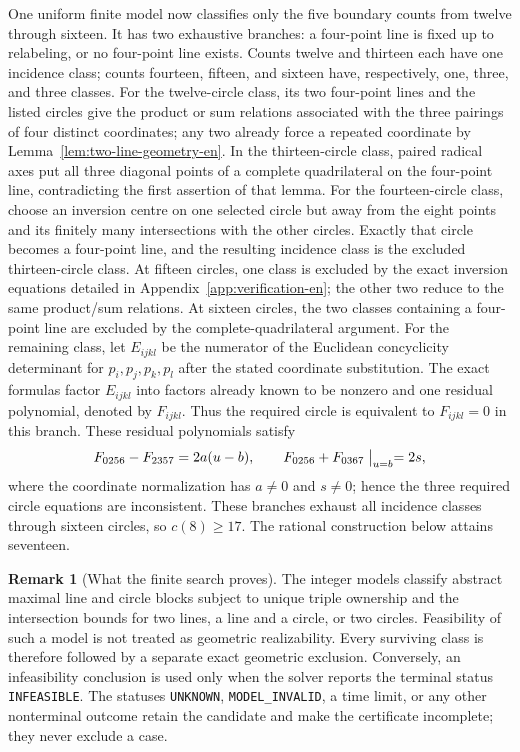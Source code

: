 \documentclass[11pt,a4paper]{article}
\theoremstyle{definition}
\newtheorem{remark}[theorem]{Remark}
\begin{document}
One uniform finite model now classifies only the five boundary counts from
twelve through sixteen.  It has two exhaustive branches: a four-point line is
fixed up to relabeling, or no four-point line exists.  Counts twelve and thirteen
each have one incidence class; counts fourteen, fifteen, and sixteen have,
respectively, one, three, and three classes.  For the
twelve-circle class, its two
four-point lines and the listed circles give the product or sum relations associated
with the three pairings of four distinct coordinates; any two already force a
repeated coordinate by Lemma~\ref{lem:two-line-geometry-en}.  In the
thirteen-circle class, paired radical axes put all three diagonal points of a
complete quadrilateral on the four-point line, contradicting the first assertion of
that lemma.  For the fourteen-circle class, choose an inversion centre on one
selected circle but away from the eight points and its finitely many intersections
with the other circles.  Exactly that circle becomes a four-point line, and the
resulting incidence class is the excluded thirteen-circle class.  At fifteen
circles, one class is excluded by the exact inversion equations
detailed in Appendix~\ref{app:verification-en}; the other two reduce to the same
product/sum relations.  At sixteen circles, the two classes containing a four-point
line are excluded by the complete-quadrilateral argument.  For the remaining class,
let $E_{ijkl}$ be the numerator of the Euclidean concyclicity determinant for
$p_i,p_j,p_k,p_l$ after the stated coordinate substitution.  The exact formulas
factor $E_{ijkl}$ into factors already known to be nonzero and one residual
polynomial, denoted by $F_{ijkl}$.  Thus the required circle is equivalent to
$F_{ijkl}=0$ in this branch.  These residual polynomials satisfy
\[
F_{0256}-F_{2357}=2a(u-b),\qquad
F_{0256}+F_{0367}\bigm|_{u=b}=2s,
\]
where the coordinate normalization has $a\ne0$ and $s\ne0$; hence the three
required circle equations are inconsistent.  These branches exhaust all incidence
classes through sixteen circles, so $c(8)\ge17$.  The rational construction below
attains seventeen.

\begin{remark}[What the finite search proves]
The integer models classify abstract maximal line and circle blocks subject to
unique triple ownership and the intersection bounds for two lines, a line and a
circle, or two circles.  Feasibility of such a model is not treated as geometric
realizability.  Every surviving class is therefore followed by a separate exact
geometric exclusion.  Conversely, an infeasibility conclusion is used only when
the solver reports the terminal status \texttt{INFEASIBLE}.  The statuses
\texttt{UNKNOWN}, \texttt{MODEL\_INVALID}, a time limit, or any other nonterminal
outcome retain the candidate and make the certificate incomplete; they never
exclude a case.
\end{remark}
\end{document}
